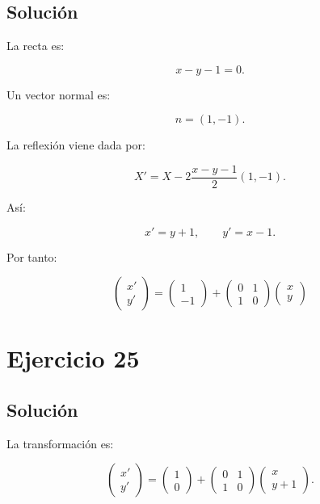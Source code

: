 \documentclass[11pt,a4paper]{article}
\begin{document}
\subsection{Solución}

La recta es:

\[
x-y-1=0.
\]

Un vector normal es:

\[
n=(1,-1).
\]

La reflexión viene dada por:

\[
X'
=
X
-
2\frac{x-y-1}{2}(1,-1).
\]

Así:

\[
x'=y+1,
\qquad
y'=x-1.
\]

Por tanto:

\[
\boxed{
\begin{pmatrix}
x'\\
y'
\end{pmatrix}
=
\begin{pmatrix}
1\\
-1
\end{pmatrix}
+
\begin{pmatrix}
0&1\\
1&0
\end{pmatrix}
\begin{pmatrix}
x\\
y
\end{pmatrix}
}
\]

\section{Ejercicio 25}
\subsection{Solución}

La transformación es:

\[
\begin{pmatrix}
x'\\
y'
\end{pmatrix}
=
\begin{pmatrix}
1\\
0
\end{pmatrix}
+
\begin{pmatrix}
0&1\\
1&0
\end{pmatrix}
\begin{pmatrix}
x\\
y+1
\end{pmatrix}.
\]
\end{document}
